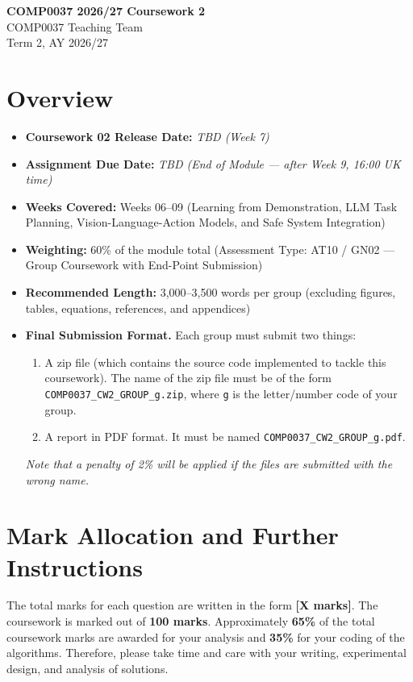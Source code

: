 \documentclass[11pt,a4paper]{article}
\begin{document}
\begin{center}
    {\LARGE \textbf{COMP0037 2026/27 Coursework 2}}\\[0.5em]
    {\large COMP0037 Teaching Team}\\[0.3em]
    {\normalsize Term 2, AY 2026/27}
\end{center}

\section*{Overview}
\begin{itemize}[leftmargin=1.5em, itemsep=0.25em]
    \item \textbf{Coursework 02 Release Date:} \textit{TBD (Week 7)}
    \item \textbf{Assignment Due Date:} \textit{TBD (End of Module --- after Week 9, 16:00 UK time)}
    \item \textbf{Weeks Covered:} Weeks 06--09 (Learning from Demonstration, LLM Task Planning, Vision-Language-Action Models, and Safe System Integration)
    \item \textbf{Weighting:} 60\% of the module total (Assessment Type: AT10 / GN02 --- Group Coursework with End-Point Submission)
    \item \textbf{Recommended Length:} 3,000--3,500 words per group (excluding figures, tables, equations, references, and appendices)
    \item \textbf{Final Submission Format.} Each group must submit two things:
    \begin{enumerate}[label=\arabic*., leftmargin=1.8em, itemsep=0.2em]
        \item A zip file (which contains the source code implemented to tackle this coursework). The name of the zip file must be of the form \texttt{COMP0037\_CW2\_GROUP\_g.zip}, where \texttt{g} is the letter/number code of your group.
        \item A report in PDF format. It must be named \texttt{COMP0037\_CW2\_GROUP\_g.pdf}.
    \end{enumerate}
    \textit{Note that a penalty of 2\% will be applied if the files are submitted with the wrong name.}
\end{itemize}

\section*{Mark Allocation and Further Instructions}
The total marks for each question are written in the form \textbf{[X marks]}. The coursework is marked out of \textbf{100 marks}. Approximately \textbf{65\%} of the total coursework marks are awarded for your analysis and \textbf{35\%} for your coding of the algorithms. Therefore, please take time and care with your writing, experimental design, and analysis of solutions.
\end{document}
